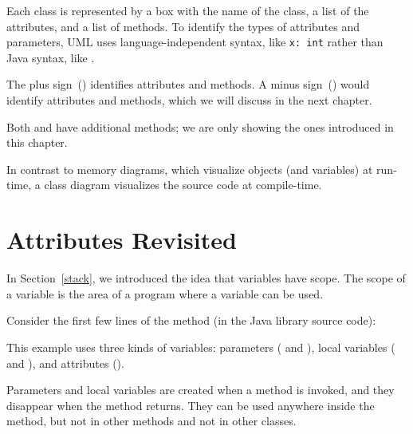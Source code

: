 
Each class is represented by a box with the name of the class, a list of the attributes, and a list of methods.
To identify the types of attributes and parameters, UML uses language-independent syntax, like {\tt x:~int} rather than Java syntax, like
.

The plus sign~(\java{+}) identifies  attributes and methods.
A minus sign~(\java{-}) would identify  attributes and methods, which we will discuss in the next chapter.

Both  and  have additional methods; we are only showing the ones introduced in this chapter.

In contrast to memory diagrams, which visualize objects (and variables) at run-time, a class diagram visualizes the source code at compile-time.



\section{Attributes Revisited}


In Section~\ref{stack}, we introduced the idea that variables have scope.
The scope of a variable is the area of a program where a variable can be used.

Consider the first few lines of the  method (in the Java library source code):

\begin{code}
public void translate(int dx, int dy) {
    int oldv = this.x;
    int newv = oldv + dx;
    if (dx < 0) {
    ...
\end{code}

This example uses three kinds of variables: parameters ( and ), local variables ( and ), and attributes ().

Parameters and local variables are created when a method is invoked, and they disappear when the method returns.  They can be used anywhere inside the method, but not in other methods and not in other classes.

